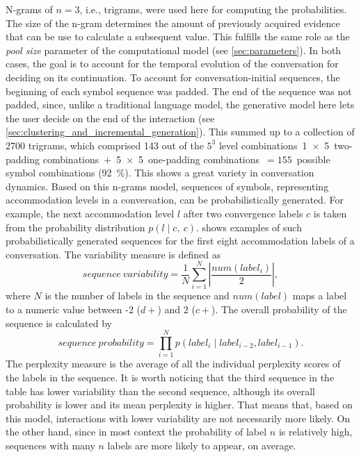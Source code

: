 N-grams of $n = 3$, i.e., trigrams, were used here for computing the probabilities.
The size of the n-gram determines the amount of previously acquired evidence that can be use to calculate a subsequent value.
This fulfills the same role as the \emph{pool size} parameter of the computational model (see \cref{sec:parameters}).
In both cases, the goal is to account for the temporal evolution of the conversation for deciding on its continuation.
To account for conversation-initial sequences, the beginning of each symbol sequence was padded.
The end of the sequence was not padded, since, unlike a traditional language model, the generative model here lets the user decide on the end of the interaction (see \cref{sec:clustering_and_incremental_generation}).
This summed up to a collection of \num{2700} trigrams, which comprised 143 out of the $5^3$ level combinations~1~$\times$~5~two-padding combinations~+~5~$\times$~5~one-padding combinations~$= 155$~possible symbol combinations (\SI{92}{\percent}).
This shows a great variety in conversation dynamics.
Based on this n-grams model, sequences of symbols, representing accommodation levels in a conversation, can be probabilistically generated.
For example, the next accommodation level $l$ after two convergence labels $c$ is taken from the probability distribution $p(l \mid c,\ c)$.
 shows examples of such probabilistically generated sequences for the first eight accommodation labels of a conversation.
The variability measure is defined as
%
\begin{equation}
	sequence\ variability = \frac{1}{N} \sum_{i=1}^{N} \left| \frac{num(label_i)}{2} \right|,
\end{equation}
%
where $N$ is the number of labels in the sequence and $num(label)$ maps a label to a numeric value between -2 ($d+$) and 2 ($c+$).
The overall probability of the sequence is calculated by
%
\begin{equation}
	sequence\ probability = \prod_{i=1}^{N} p(label_i \mid label_{i-2}, label_{i-1}).
\end{equation}
%
The perplexity measure is the average of all the individual perplexity scores of the labels in the sequence.
It is worth noticing that the third sequence in the table has lower variability than the second sequence, although its overall probability is lower and its mean perplexity is higher.
That means that, based on this model, interactions with lower variability are not necessarily more likely.
On the other hand, since in most context the probability of label $n$ is relatively high, sequences with many $n$ labels are more likely to appear, on average.

